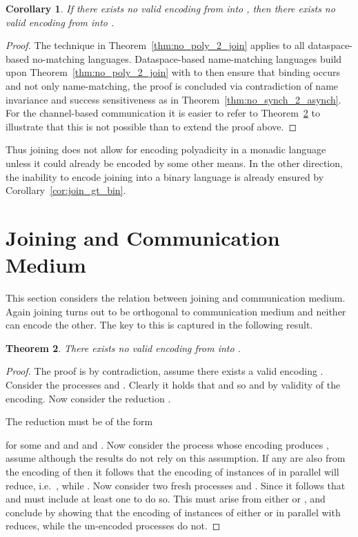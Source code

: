 \documentclass[submission,copyright,creativecommons]{eptcs}
\newtheorem{theorem}{Theorem}[section]
\newtheorem{corollary}[theorem]{Corollary}
\begin{document}
\begin{corollary}
If there exists no valid encoding from
 into , then there exists
no valid encoding from  into .
\end{corollary}
\begin{proof}
The technique in Theorem~\ref{thm:no_poly_2_join} applies to all dataspace-based no-matching languages.
Dataspace-based name-matching languages build upon Theorem~\ref{thm:no_poly_2_join} with
 to then ensure that binding occurs and not only name-matching,
the proof is concluded via contradiction of name invariance and success sensitiveness as in
Theorem~\ref{thm:no_synch_2_asynch}.
For the channel-based communication it is easier to refer to Theorem~\ref{thm:no_chan_2_join} to
illustrate that this is not possible than to extend the proof above.
\end{proof}

Thus joining does not allow for encoding polyadicity in a monadic language unless it could already be
encoded by some other means.
In the other direction, the inability to encode joining into a binary language is already 
ensured by Corollary~\ref{cor:join_gt_bin}.


\section{Joining and Communication Medium}
\label{sec:join_comm}

This section considers the relation between joining and communication medium. Again joining turns out
to be orthogonal to communication medium and neither can encode the other.
The key to this is captured in the following result.


\begin{theorem}
\label{thm:no_chan_2_join}
There exists no valid encoding from  into .
\end{theorem}
\begin{proof}
The proof is by contradiction, assume there exists a valid encoding .
Consider the  processes  and .
Clearly it holds that  and so  and 
by validity of the encoding. Now consider the reduction .

The reduction must be of the form

for some  and  and  and .
Now consider the process whose encoding produces ,
assume  although the results do not rely on this assumption.
If any  are also from the encoding of  then it follows that the encoding of
 instances of  in parallel will reduce, i.e.~, while
.
Now consider two fresh processes  and .
Since  it follows that  and must include at least one
 to do so.
This  must arise from either  or , and conclude by showing that
the encoding of  instances of either  or  in parallel with  reduces, while the
un-encoded processes do not.
\end{proof}
\end{document}

